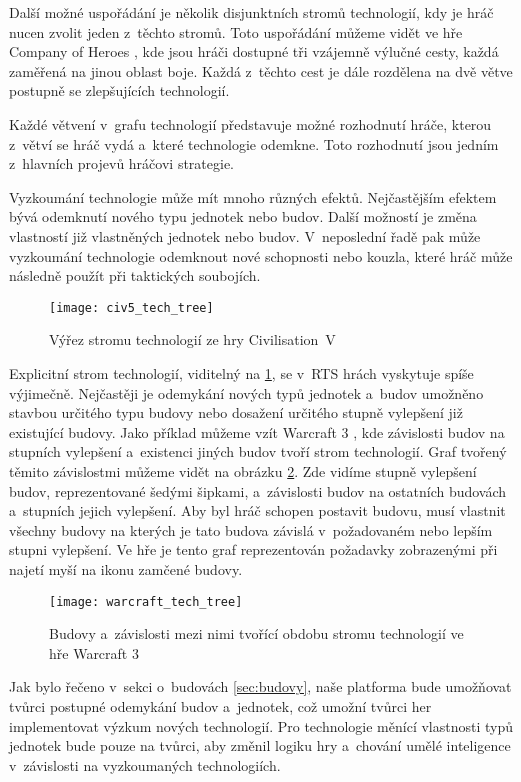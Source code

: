 Další možné uspořádání je několik disjunktních stromů technologií, kdy je hráč nucen zvolit jeden z~těchto stromů. 
Toto uspořádání můžeme vidět ve hře Company of Heroes \citep{site:COH}, kde jsou hráči dostupné tři vzájemně výlučné cesty, každá zaměřená na jinou oblast boje. Každá z~těchto cest je dále rozdělena na dvě větve postupně se zlepšujících technologií.

Každé větvení v~grafu technologií představuje možné rozhodnutí hráče, kterou z~větví se hráč vydá a~které technologie odemkne. Toto rozhodnutí jsou jedním z~hlavních projevů hráčovi strategie.

Vyzkoumání technologie může mít mnoho různých efektů. Nejčastějším efektem bývá odemknutí nového typu jednotek nebo budov. Další možností je změna vlastností již vlastněných jednotek nebo budov. V~neposlední řadě pak může vyzkoumání technologie odemknout nové schopnosti nebo kouzla, které hráč může následně použít při taktických soubojích. 

\begin{figure}[h]	
	\centering
	\texttt{[image: civ5\_tech\_tree]}
	\caption{Výřez stromu technologií ze hry Civilisation~V\citep{site:civ5}}
	\label{fig:civ5techtree}
\end{figure}


Explicitní strom technologií, viditelný na \ref{fig:civ5techtree}, se v~RTS hrách vyskytuje spíše výjimečně. Nejčastěji je odemykání nových typů jednotek a~budov umožněno stavbou určitého typu budovy nebo dosažení určitého stupně vylepšení již existující budovy. Jako příklad můžeme vzít Warcraft 3 \citep{site:warcraft3}, kde závislosti budov na stupních vylepšení a~existenci jiných budov tvoří strom technologií. Graf tvořený těmito závislostmi můžeme vidět na obrázku \ref{fig:warcrafttechtree}. Zde vidíme stupně vylepšení budov, reprezentované šedými šipkami, a~závislosti budov na ostatních budovách a~stupních jejich vylepšení. Aby byl hráč schopen postavit budovu, musí vlastnit všechny budovy na kterých je tato budova závislá v~požadovaném nebo lepším stupni vylepšení. Ve hře je tento graf reprezentován požadavky zobrazenými při najetí myší na ikonu zamčené budovy.

\begin{figure}[h]	
	\centering
	\texttt{[image: warcraft\_tech\_tree]}
	\caption{Budovy a~závislosti mezi nimi tvořící obdobu stromu technologií ve hře Warcraft 3}
	\label{fig:warcrafttechtree}
\end{figure}

Jak bylo řečeno v~sekci o~budovách \ref{sec:budovy}, naše platforma bude umožňovat tvůrci postupné odemykání budov a~jednotek, což umožní tvůrci her implementovat výzkum nových technologií. Pro technologie měnící vlastnosti typů jednotek bude pouze na tvůrci, aby změnil logiku hry a~chování umělé inteligence v~závislosti na vyzkoumaných technologiích.

